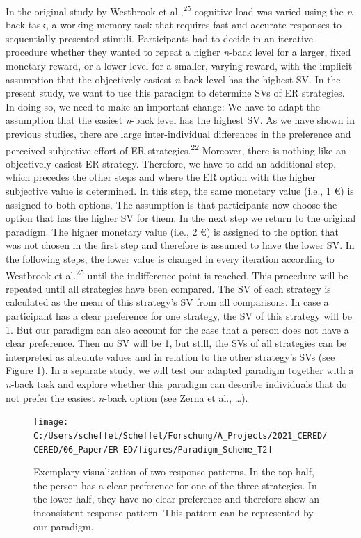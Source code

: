\documentclass[
  english,
  man,floatsintext]{apa6}
\begin{document}
In the original study by Westbrook et al.,\textsuperscript{25} cognitive load was varied using the \emph{n}-back task, a working memory task that requires fast and accurate responses to sequentially presented stimuli.
Participants had to decide in an iterative procedure whether they wanted to repeat a higher \emph{n}-back level for a larger, fixed monetary reward, or a lower level for a smaller, varying reward, with the implicit assumption that the objectively easiest \emph{n}-back level has the highest SV.
In the present study, we want to use this paradigm to determine SVs of ER strategies.
In doing so, we need to make an important change: We have to adapt the assumption that the easiest \emph{n}-back level has the highest SV.
As we have shown in previous studies, there are large inter-individual differences in the preference and perceived subjective effort of ER strategies.\textsuperscript{22}
Moreover, there is nothing like an objectively easiest ER strategy.
Therefore, we have to add an additional step, which precedes the other steps and where the ER option with the higher subjective value is determined.
In this step, the same monetary value (i.e., 1 €) is assigned to both options.
The assumption is that participants now choose the option that has the higher SV for them.
In the next step we return to the original paradigm.
The higher monetary value (i.e., 2 €) is assigned to the option that was not chosen in the first step and therefore is assumed to have the lower SV.
In the following steps, the lower value is changed in every iteration according to Westbrook et al.\textsuperscript{25} until the indifference point is reached.
This procedure will be repeated until all strategies have been compared.
The SV of each strategy is calculated as the mean of this strategy's SV from all comparisons.
In case a participant has a clear preference for one strategy, the SV of this strategy will be 1.
But our paradigm can also account for the case that a person does not have a clear preference.
Then no SV will be 1, but still, the SVs of all strategies can be interpreted as absolute values and in relation to the other strategy's SVs (see Figure \ref{fig:ResponsePatterns}).
In a separate study, we will test our adapted paradigm together with a \emph{n}-back task and explore whether this paradigm can describe individuals that do not prefer the easiest \emph{n}-back option (see Zerna et al., \ldots).

\begin{figure}
\texttt{[image: C:/Users/scheffel/Scheffel/Forschung/A\_Projects/2021\_CERED/CERED/06\_Paper/ER-ED/figures/Paradigm\_Scheme\_T2]} \caption{Exemplary visualization of two response patterns. In the top half, the person has a clear preference for one of the three strategies. In the lower half, they have no clear preference and therefore show an inconsistent response pattern. This pattern can be represented by our paradigm.}\label{fig:ResponsePatterns}
\end{figure}
\end{document}
